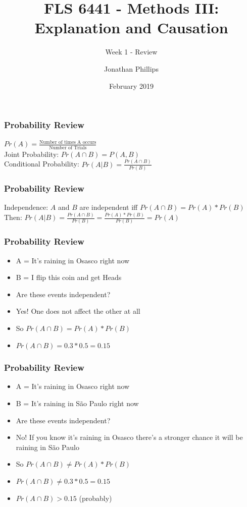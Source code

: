 \documentclass[xcolor=x11names,compress]{beamer}\usepackage[]{graphicx}\usepackage[]{color}
\title{FLS 6441 - Methods III: Explanation and Causation}
\subtitle{Week 1 - Review}
\author{Jonathan Phillips}
\date{February 2019}
\renewcommand{\(}{\begin{columns}}
\renewcommand{\)}{\end{columns}}
\newcommand{\<}[1]{\begin{column}{#1}}
\renewcommand{\>}{\end{column}}
\begin{document}
\frame{\titlepage}

\begin{frame}
\frametitle{Probability Review}
\begin{center}
$Pr(A)=\frac{\text{Number of times A occurs}}{\text{Number of Trials}}$ \\
Joint Probability: $Pr(A \cap B) = P(A,B)$ \\
Conditional Probability: $Pr(A|B) = \frac{Pr(A \cap B)}{Pr(B)}$ \\
\end{center}
\end{frame}

\begin{frame}
\frametitle{Probability Review}
\begin{center}
Independence: $A$ and $B$ are independent iff $Pr(A \cap B) = Pr(A) * Pr(B)$ \\
Then: $Pr(A|B) = \frac{Pr(A \cap B)}{Pr(B)} = \frac{Pr(A) * Pr(B)}{Pr(B)} = Pr(A)$ \\
\end{center}
\end{frame}

\begin{frame}
\frametitle{Probability Review}
\begin{itemize}
\item A = It's raining in Osasco right now
\item B = I flip this coin and get Heads
\item Are these events independent?
\pause
\item Yes! One does not affect the other at all
\item So $Pr(A \cap B) = Pr(A)*Pr(B)$
\item $Pr(A \cap B) = 0.3 * 0.5 = 0.15$
\end{itemize}
\end{frame}

\begin{frame}
\frametitle{Probability Review}
\begin{itemize}
\item A = It's raining in Osasco right now
\item B = It's raining in S\~{a}o Paulo right now
\item Are these events independent?
\pause
\item No! If you know it's raining in Osasco there's a stronger chance it will be raining in S\~{a}o Paulo
\item So $Pr(A \cap B) \neq Pr(A)*Pr(B)$
\item $Pr(A \cap B) \neq 0.3 * 0.5 = 0.15$
\item $Pr(A \cap B) > 0.15$ (probably)
\end{itemize}
\end{frame}
\end{document}
